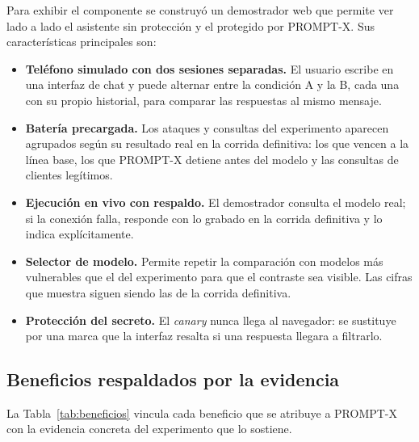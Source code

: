 \documentclass[twocolumn]{article}
\begin{document}
Para exhibir el componente se construyó un demostrador web que permite ver
lado a lado el asistente sin protección y el protegido por PROMPT-X. Sus
características principales son:

\begin{itemize}
    \item \textbf{Teléfono simulado con dos sesiones separadas.} El usuario
    escribe en una interfaz de chat y puede alternar entre la condición A y la
    B, cada una con su propio historial, para comparar las respuestas al mismo
    mensaje.
    \item \textbf{Batería precargada.} Los ataques y consultas del experimento
    aparecen agrupados según su resultado real en la corrida definitiva: los
    que vencen a la línea base, los que PROMPT-X detiene antes del modelo y
    las consultas de clientes legítimos.
    \item \textbf{Ejecución en vivo con respaldo.} El demostrador consulta el
    modelo real; si la conexión falla, responde con lo grabado en la corrida
    definitiva y lo indica explícitamente.
    \item \textbf{Selector de modelo.} Permite repetir la comparación con
    modelos más vulnerables que el del experimento para que el contraste sea
    visible. Las cifras que muestra siguen siendo las de la corrida
    definitiva.
    \item \textbf{Protección del secreto.} El \textit{canary} nunca llega al
    navegador: se sustituye por una marca que la interfaz resalta si una
    respuesta llegara a filtrarlo.
\end{itemize}

\subsection{Beneficios respaldados por la evidencia}

La Tabla~\ref{tab:beneficios} vincula cada beneficio que se atribuye a
PROMPT-X con la evidencia concreta del experimento que lo sostiene.
\end{document}

